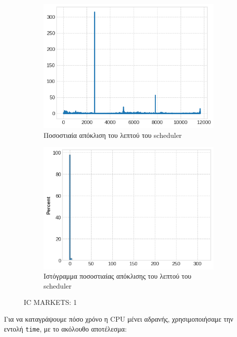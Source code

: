 \documentclass[12pt, a4paper]{article}
\begin{document}
\begin{figure}[h!]
\begin{subfigure}[b]{0.45\textwidth}
\centering
\includegraphics[width=\textwidth]{delay_candlestick_line_icm.png}
\caption{Ποσοστιαία απόκλιση του λεπτού του scheduler}
\label{fig:sub3}
\end{subfigure}
\hfill
\begin{subfigure}[b]{0.45\textwidth}
\centering
\includegraphics[width=\textwidth]{delay_candlestick_hist_icm.png}
\caption{Ιστόγραμμα ποσοστιαίας απόκλισης του λεπτού του scheduler}
\end{subfigure}
\caption{IC MARKETS: 1}
\end{figure}

\clearpage

Για να καταγράψουμε πόσο χρόνο η CPU μένει αδρανής, χρησιμοποιήσαμε την εντολή \verb|time|, με το ακόλουθο αποτέλεσμα:
\end{document}
